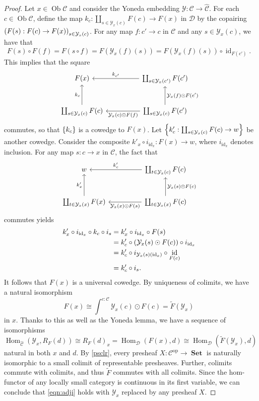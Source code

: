 \documentclass[10pt,letterpaper,cm]{nupset}
\theoremstyle{definition}
\theoremstyle{theorem}
\theoremstyle{remark}
\DeclareMathOperator{\ob}{Ob}
\newcommand{\0}{\mathbf{0}}
\newcommand{\1}{\mathbf{1}}
\newcommand{\2}{\mathbf{2}}
\DeclareMathOperator{\op}{op}
\DeclareMathOperator{\set}{\mathbf{Set}}
\renewcommand{\c}{\mathscr{C}}
\renewcommand{\d}{\mathscr{D}}
\DeclareMathOperator{\Hom}{Hom}
\DeclareMathOperator{\idd}{id}
\begin{document}
\begin{proof}
Let $x\in \ob{\c}$ and consider the Yoneda embedding $\mathcal{Y} : \c \to \widehat{\c}$. For each $c\in \ob{\c}$, define the map $k_c :\coprod_{s\in \mathcal{Y}_x(c)}F(c) \to F(x)$ in $\d$ by the copairing $\mleft(F(s) :F(c)\to F(x)\mright)_{s\in \mathcal{Y}_x(c)}$. For any map $f: c' \to c$ in $\c$ and any $s\in \mathcal{Y}_x(c)$, we have that 
$$F(s) \circ F(f) = F(s \circ f) =  F(\mathcal{Y}_x(f)(s)) = F(\mathcal{Y}_x(f)(s)) \circ \idd_{F(c')}.$$ This implies that the square
\[
\begin{tikzcd}[column sep=huge, row sep = large]
F(x)                                       & \coprod_{s\in \mathcal{Y}_x(c')}F(c') \arrow[l, "k_{c'}"']                                                \\
\coprod_{s\in \mathcal{Y}_x(c)}F(c) \arrow[u, "k_c"] & \coprod_{s\in \mathcal{Y}_x(c)}F(c') \arrow[l, "\mathcal{Y}_x(c)\odot F(f)"] \arrow[u, "\mathcal{Y}_x(f) \odot F(c')"']
\end{tikzcd}
\] commutes, so that $\mleft\{k_c\mright\}$ is a cowedge  to $F(x)$. Let $\mleft\{k'_c : \coprod_{s\in \mathcal{Y}_x(c)}F(c) \to w \mright\}$ be another cowedge. Consider the composite $k'_x \circ i_{\idd_x} : F(x) \to w$, where $ i_{\idd_x}$ denotes inclusion. For any map $s: c\to x$ in $\c$, the fact that
\[
\begin{tikzcd}[column sep=huge, row sep = large]
w                                           & \coprod_{t\in \mathcal{Y}_x(c)}F(c) \arrow[l, "k_{c}'"']                                          \\
\coprod_{t\in \mathcal{Y}_x(x)}F(x) \arrow[u, "k_x'"] & \coprod_{t\in \mathcal{Y}_x(x)}F(c) \arrow[l, "\mathcal{Y}_x(x)\odot F(s)"] \arrow[u, "\mathcal{Y}_x(s) \odot F(c)"']
\end{tikzcd}
\] commutes yields
\begin{align*}
k'_x \circ i_{\idd_x} \circ k_c \circ i_s & = k'_x \circ i_{\idd_x} \circ  F(s) 
\\ & =k'_c \circ \mleft( \mathcal{Y}_x(s) \odot F(c) \mright) \circ i_{\idd_x}
\\ & =  k'_c \circ i_{\mathcal{Y}_x(s)(\idd_x)} \circ \idd_{F(c)} 
\\ & =k'_c \circ i_s.
\end{align*}
It follows that $F(x)$ is a universal cowedge. By uniqueness of colimits, we have a natural isomorphism $$F(x) \cong \int^{c:\c} \mathcal{Y}_x(c) \odot F(c) = \widetilde{F}(\mathcal{Y}_x)$$ in $x$. Thanks to this as well as the Yoneda lemma, we have a sequence of isomorphisms
\[
\label{eqn:adji} \Hom_{\widehat{\c}}(\mathcal{Y}_x, R_F(d)) \cong R_F(d)_x = \Hom_{\d}(F(x), d) \cong \Hom_{\d}(\widetilde{F}(\mathcal{Y}_x), d)
\tag{$\blacklozenge$}
\] natural in both $x$ and $d$. By \cref{psclr}, every presheaf $X : \c^{\op} \to \set$ is naturally isomorphic to a small colimit of representable presheaves. Further, colimits commute with colimits, and thus $\widetilde{F}$ commutes with all colimits. Since the hom-functor of any locally small category is continuous in its first variable, we can conclude that \eqref{eqn:adji} holds with $\mathcal{Y}_x$ replaced by any presheaf $X$.
\end{proof}
\end{document}
